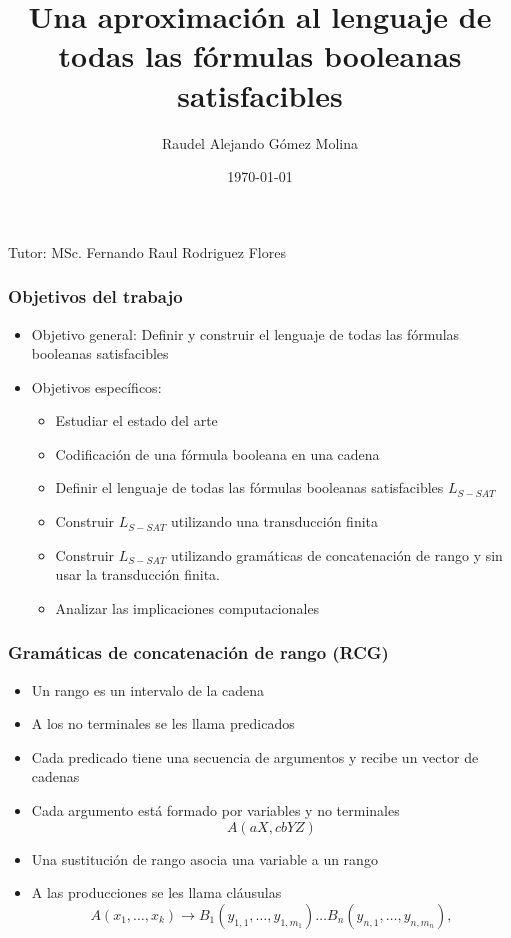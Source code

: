 \documentclass{beamer}
\title{Una aproximación al lenguaje de todas las fórmulas booleanas satisfacibles}
\author{Raudel Alejando Gómez Molina}
\institute{Facultad de Matemática y Computación \\ Universidad de La Habana}
\date{\today}
\newcommand{\tutor}{MSc. Fernando Raul Rodriguez Flores} %
\begin{document}
\begin{frame}
    \titlepage
    \vspace{1cm} %
    \begin{center}
        Tutor: \tutor \\ %
        \smallskip
    \end{center}
\end{frame}

\begin{frame}
    \frametitle{Objetivos del trabajo}

    \begin{itemize}
        \item Objetivo general: Definir y construir el lenguaje de todas las fórmulas booleanas satisfacibles
        \item Objetivos específicos:
              \begin{itemize}
                  \item Estudiar el estado del arte
                  \item Codificación de una fórmula booleana en una cadena
                  \item Definir el lenguaje de todas las fórmulas booleanas satisfacibles $L_{S-SAT}$
                  \item Construir $L_{S-SAT}$ utilizando una transducción finita
                  \item Construir $L_{S-SAT}$ utilizando gramáticas de concatenación de rango y sin usar la transducción finita.
                  \item Analizar las implicaciones computacionales
              \end{itemize}
    \end{itemize}


\end{frame}

\begin{frame}
    \frametitle{Gramáticas de concatenación de rango (RCG)}

    \begin{itemize}
        \item Un rango es un intervalo de la cadena
        \item A los no terminales se les llama predicados
        \item Cada predicado tiene una secuencia de argumentos y recibe un vector de cadenas
        \item Cada argumento está formado por variables y no terminales
              $$A(aX,cbYZ)$$
        \item Una sustitución de rango asocia una variable a un rango
        \item A las producciones se les llama cláusulas
              \[
                  A(x_1, \ldots, x_k) \to B_1(y_{1,1}, \ldots, y_{1,m_1}) \ldots B_n(y_{n,1}, \ldots, y_{n,m_n}),
              \]


    \end{itemize}
\end{frame}
\end{document}
